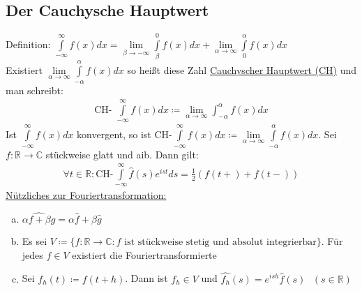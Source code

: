 \documentclass{article}
\begin{document}
\subsection{Der Cauchysche Hauptwert}
Definition: $ \int \limits_{-\infty}^\infty f(x) dx= \lim \limits_{\beta \to - \infty} \int \limits_\beta^0 f(x) dx + \lim \limits_{\alpha \to \infty} \int \limits_0^\alpha f(x) dx$ \\
Existiert $\lim \limits_{\alpha \to \infty} \int \limits_{-\alpha}^\alpha f(x) dx$ so heißt diese Zahl \underline{Cauchyscher Hauptwert (CH)} und man schreibt: 
\begin{align*}
    \text{CH- } \int \limits_{- \infty}^\infty f(x) dx \coloneqq \lim \limits_{\alpha \to \infty} \int_{-\alpha}^\alpha f(x) dx
\end{align*}
Ist $\int \limits_{-\infty}^{\infty} f(x) dx$ konvergent, so ist $\text{CH-} \int \limits_{-\infty}^\infty f(x) dx \coloneqq \lim \limits_{\alpha \to \infty} \int \limits_{-\alpha}^\alpha f(x) dx$.
Sei $f: \mathbb{R} \to \mathbb{C}$ stückweise glatt und aib. Dann gilt:
\begin{align*}
    \forall t \in \mathbb{R}: \text{CH-}\int \limits_{-\infty}^\infty \widehat{f}(s)e^{ist} ds = \frac{1}{2} (f(t+) + f(t-))
\end{align*}
\underline{Nützliches zur Fouriertransformation:}
\begin{enumerate} [a)]
    \item $\widehat{\alpha f + \beta g} = \alpha \widehat{f} + \beta \widehat{g}$
    \item Es sei $V \coloneqq \{ f: \mathbb{R} \to \mathbb{C}: f \text{ ist stückweise stetig und absolut integrierbar}\}$. Für jedes $f \in V$ existiert die Fouriertransformierte
    \item Sei $f_h(t) \coloneqq f(t+h)$. Dann ist $f_h \in V$ und $\widehat{f_h}(s) = e^{ish} \widehat{f}(s) \text{ } (s \in \mathbb{R})$
\end{enumerate}
\end{document}
